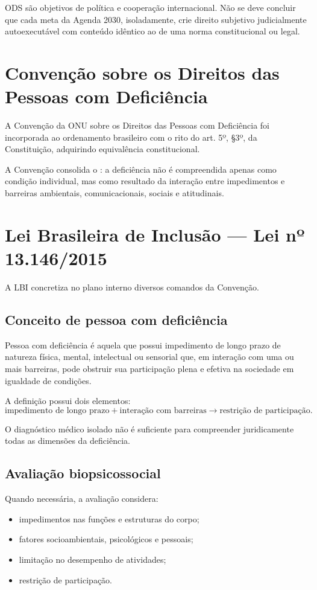 ODS são objetivos de política e cooperação internacional. Não se deve concluir que cada meta da Agenda 2030, isoladamente, crie direito subjetivo judicialmente autoexecutável com conteúdo idêntico ao de uma norma constitucional ou legal.

\section{Convenção sobre os Direitos das Pessoas com Deficiência}

A Convenção da ONU sobre os Direitos das Pessoas com Deficiência foi incorporada ao ordenamento brasileiro com o rito do art. 5º, §3º, da Constituição, adquirindo equivalência constitucional.

A Convenção consolida o : a deficiência não é compreendida apenas como condição individual, mas como resultado da interação entre impedimentos e barreiras ambientais, comunicacionais, sociais e atitudinais.

\section{Lei Brasileira de Inclusão — Lei nº 13.146/2015}

A LBI concretiza no plano interno diversos comandos da Convenção.

\subsection{Conceito de pessoa com deficiência}

Pessoa com deficiência é aquela que possui impedimento de longo prazo de natureza física, mental, intelectual ou sensorial que, em interação com uma ou mais barreiras, pode obstruir sua participação plena e efetiva na sociedade em igualdade de condições.

A definição possui dois elementos:
\[
\text{impedimento de longo prazo}
+
\text{interação com barreiras}
\rightarrow
\text{restrição de participação}.
\]

O diagnóstico médico isolado não é suficiente para compreender juridicamente todas as dimensões da deficiência.

\subsection{Avaliação biopsicossocial}

Quando necessária, a avaliação considera:
\begin{itemize}
\item impedimentos nas funções e estruturas do corpo;
\item fatores socioambientais, psicológicos e pessoais;
\item limitação no desempenho de atividades;
\item restrição de participação.
\end{itemize}

